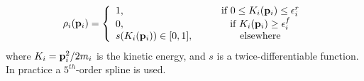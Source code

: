\begin{equation}
    \label{eq:restrainingfunction}
    \rho_{i}(\mathbf{p}_{i}) =
    \displaystyle\left\lbrace
    \begin{array}{lccc}
        1, & & & \textrm{if } 0 \leq K_{i}(\mathbf{p}_{i}) \leq \epsilon_{i}^{r} \\
        0, & & & \textrm{if } K_{i}(\mathbf{p}_{i}) \geq \epsilon_{i}^{f} \\
        s(K_{i}(\mathbf{p}_{i})) \in [0, 1], & & & \textrm{elsewhere} \\
    \end{array}
    \right.
\end{equation}
where $K_i=\mathbf{p}_{i}^2/2m_{i}$ is the kinetic energy, and
$s$ is a twice-differentiable function. In practice a $5^{th}$-order spline is used.

